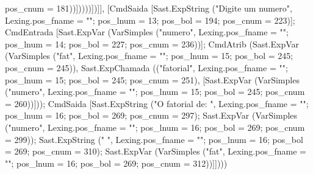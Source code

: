 \documentclass[12pt,a4paper,twoside]{article}
\begin{document}
\begin{terminal}
{{                        pos_cnum = 181}))]))))])]}],
     [CmdSaida
       [Sast.ExpString
         ("Digite um numero",
          {Lexing.pos_fname = ""; pos_lnum = 13; pos_bol = 194;
           pos_cnum = 223})];
      CmdEntrada
       [Sast.ExpVar
         (VarSimples
           ("numero",
            {Lexing.pos_fname = ""; pos_lnum = 14; pos_bol = 227;
             pos_cnum = 236}))];
      CmdAtrib
       (Sast.ExpVar
         (VarSimples
           ("fat",
            {Lexing.pos_fname = ""; pos_lnum = 15; pos_bol = 245;
             pos_cnum = 245})),
       Sast.ExpChamada
        (("fatorial",
          {Lexing.pos_fname = ""; pos_lnum = 15; pos_bol = 245;
           pos_cnum = 251}),
        [Sast.ExpVar
          (VarSimples
            ("numero",
             {Lexing.pos_fname = ""; pos_lnum = 15; pos_bol = 245;
              pos_cnum = 260}))]));
      CmdSaida
       [Sast.ExpString
         ("O fatorial de: ",
          {Lexing.pos_fname = ""; pos_lnum = 16; pos_bol = 269;
           pos_cnum = 297});
        Sast.ExpVar
         (VarSimples
           ("numero",
            {Lexing.pos_fname = ""; pos_lnum = 16; pos_bol = 269;
             pos_cnum = 299}));
        Sast.ExpString
         (" ",
          {Lexing.pos_fname = ""; pos_lnum = 16; pos_bol = 269;
           pos_cnum = 310});
        Sast.ExpVar
         (VarSimples
           ("fat",
            {Lexing.pos_fname = ""; pos_lnum = 16; pos_bol = 269;
             pos_cnum = 312}))]])))
             

\end{terminal}
\end{document}
